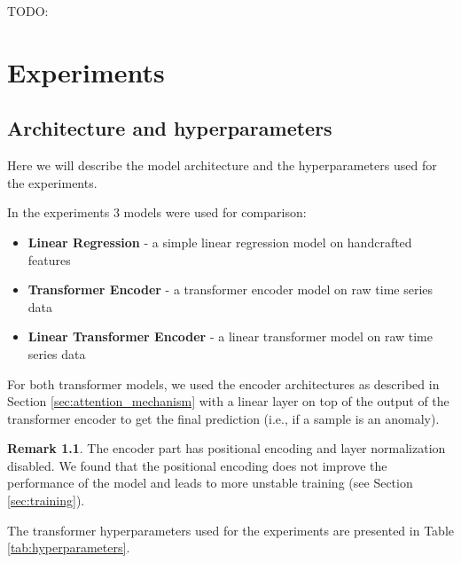 \documentclass[a4paper, twoside]{report}
\theoremstyle{definition}
\newtheorem{remark}[theorem]{Remark}
\numberwithin{equation}{section}
\begin{document}
TODO:





\chapter{Experiments}


\section{Architecture and hyperparameters}


Here we will describe the model architecture and the hyperparameters used for the experiments.

In the experiments 3 models were used for comparison:
\begin{itemize}
    \item \textbf{Linear Regression} - a simple linear regression model on handcrafted features
    \item \textbf{Transformer Encoder} - a transformer encoder model on raw time series data
    \item \textbf{Linear Transformer Encoder} - a linear transformer model on raw time series data
\end{itemize}

For both transformer models, we used the encoder architectures as described in Section \ref{sec:attention_mechanism}
with a linear layer on top of the output of the transformer encoder to get the final prediction (i.e., if a sample is an anomaly).
\begin{remark}
    The encoder part has positional encoding and layer normalization disabled.
    We found that the positional encoding does not improve the performance of the model and leads to more
    unstable training (see Section \ref{sec:training}).
\end{remark}

The transformer hyperparameters used for the experiments are presented in Table \ref{tab:hyperparameters}.
\end{document}

